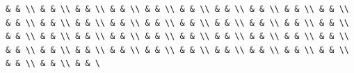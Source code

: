 \documentclass[
]{article}
\begin{document}
\begin{verbatim}
& & \\ & & \\ & & \\ & & \\ & & \\ & & \\ & & \\ & & \\ & & \\ & & \\ & & \\ & & \\ & & \\ & & \\ & & \\ & & \\ & & \\ & & \\ & & \\ & & \\ & & \\ & & \\ & & \\ & & \\ & & \\ & & \\ & & \\ & & \\ & & \\ & & \\ & & \\ & & \\ & & \\ & & \\ & & \\ & & \\ & & \\ & & \\ & & \\ & & \\ & & \\ & & \\ & & \
\end{verbatim}
\end{document}

